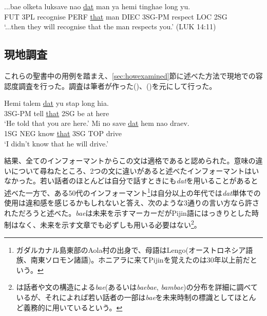 \begin{exe}
\ex
\gll ...bae olketa luksave nao \underline{dat} man ya hemi tinghae long yu.\\
FUT 3PL recognise PERF \underline{that} man DIEC 3SG-PM respect LOC 2SG\\
\glt `...then they will recognise that the man respects you.' (LUK 14:11)
\end{exe}


\subsection{現地調査}\label{sec:datfield}

これらの聖書中の用例を踏まえ、\ref{sec:howexamined}節に述べた方法で現地での容認度調査を行った。調査は筆者が作った()、()を元にして行った。

\begin{exe}
\ex\label{dat1}
\gll Hemi talem \underline{dat} yu stap long hia.\\
3SG-PM tell \underline{that} 2SG be at here\\
\glt `He told that you are here.'
\ex\label{dat2}
\gll Mi no save \underline{dat} hem nao draev.\\
1SG NEG know \underline{that} 3SG TOP drive\\
\glt `I didn't know that he will drive.'
\end{exe}

結果、全てのインフォーマントからこの文は適格であると認められた。意味の違いについて尋ねたところ、2つの文に違いがあると述べたインフォーマントはいなかった。若い話者のほとんどは自分で話すときにも\textit{dat}を用いることがあると述べた一方で、ある50代のインフォーマント\footnote{
\label{fn:lengo}ガダルカナル島東部のAola村の出身で、母語はLengo(オーストロネシア語族、南東ソロモン諸語)。ホニアラに来てPijinを覚えたのは30年以上前だという。}は自分以上の年代では\textit{dat}単体での使用は違和感を感じるかもしれないと答え、次のような3通りの言い方なら許されただろうと述べた。\textit{bae}は未来を示すマーカーだがPijin語にはっきりとした時制はなく\citep[56]{eric}、未来を示す文章でも必ずしも用いる必要はない\footnote{
  \cite{bae}は話者や文の構造による\textit{bae}(あるいは\textit{baebae}, \textit{bambae})の分布を詳細に調べているが、それによれば若い話者の一部は\textit{bae}を未来時制の標識としてほとんど義務的に用いているという。
}。

